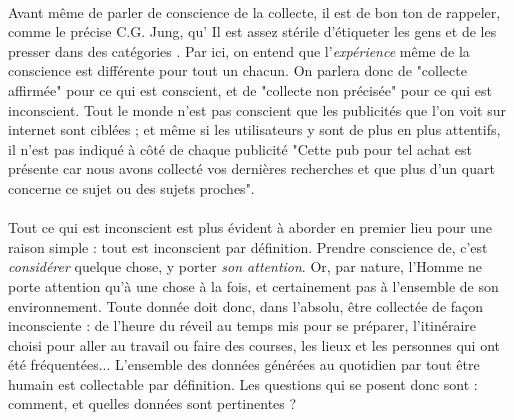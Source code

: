 \paragraph{} Avant même de parler de conscience de la collecte, il est de bon ton de rappeler,
comme le précise C.G. Jung, qu' \guillemotleft Il est assez stérile d'étiqueter les gens et de les presser dans
des catégories \guillemotright. Par ici, on entend que l'\emph{expérience} même de la conscience est différente
pour tout un chacun. On parlera donc de "collecte affirmée" pour ce qui est conscient, et de "collecte non précisée"
pour ce qui est inconscient. Tout le monde n'est pas conscient que les publicités que l'on voit sur internet sont
ciblées ; et même si les utilisateurs y sont de plus en plus attentifs, il n'est pas indiqué à côté de chaque
publicité "Cette pub pour tel achat est présente car nous avons collecté vos dernières recherches et que plus d'un
quart concerne ce sujet ou des sujets proches". 

\paragraph{} Tout ce qui est inconscient est plus évident à aborder en premier lieu pour une raison simple : tout est
inconscient par définition. Prendre conscience de, c'est \emph{considérer} quelque chose, y porter \emph{son attention}.
Or, par nature, l'Homme ne porte attention qu'à une chose à la fois, et certainement pas à l'ensemble de son
environnement. Toute donnée doit donc, dans l'absolu, être collectée de façon inconsciente : de l'heure du réveil au
temps mis pour se préparer, l'itinéraire choisi pour aller au travail ou faire des courses, les lieux et les personnes
qui ont été fréquentées... L'ensemble des données générées au quotidien par tout être humain est collectable par
définition. Les questions qui se posent donc sont : comment, et quelles données sont pertinentes ?

